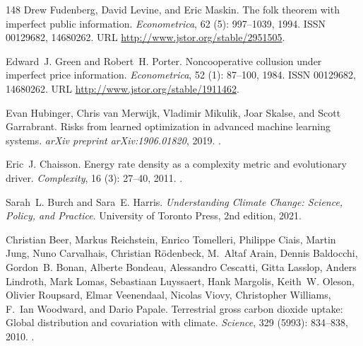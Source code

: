 \documentclass[11pt]{article}
\theoremstyle{plain}
\theoremstyle{definition}
\theoremstyle{remark}
\begin{document}
\begin{thebibliography}{148}
Drew Fudenberg, David Levine, and Eric Maskin.
\newblock The folk theorem with imperfect public information.
\newblock \emph{Econometrica}, 62 (5): 997--1039, 1994.
\newblock ISSN 00129682, 14680262.
\newblock URL \url{http://www.jstor.org/stable/2951505}.

Edward~J. Green and Robert~H. Porter.
\newblock Noncooperative collusion under imperfect price information.
\newblock \emph{Econometrica}, 52 (1): 87--100, 1984.
\newblock ISSN 00129682, 14680262.
\newblock URL \url{http://www.jstor.org/stable/1911462}.

Evan Hubinger, Chris van Merwijk, Vladimir Mikulik, Joar Skalse, and Scott
  Garrabrant.
\newblock Risks from learned optimization in advanced machine learning systems.
\newblock \emph{arXiv preprint arXiv:1906.01820}, 2019.
\newblock {}.

Eric~J. Chaisson.
\newblock Energy rate density as a complexity metric and evolutionary driver.
\newblock \emph{Complexity}, 16 (3): 27--40, 2011.
\newblock {}.

Sarah~L. Burch and Sara~E. Harris.
\newblock \emph{Understanding Climate Change: Science, Policy, and Practice}.
\newblock University of Toronto Press, 2nd edition, 2021.

Christian Beer, Markus Reichstein, Enrico Tomelleri, Philippe Ciais, Martin
  Jung, Nuno Carvalhais, Christian R{\"o}denbeck, M.~Altaf Arain, Dennis
  Baldocchi, Gordon~B. Bonan, Alberte Bondeau, Alessandro Cescatti, Gitta
  Lasslop, Anders Lindroth, Mark Lomas, Sebastiaan Luyssaert, Hank Margolis,
  Keith~W. Oleson, Olivier Roupsard, Elmar Veenendaal, Nicolas Viovy,
  Christopher Williams, F.~Ian Woodward, and Dario Papale.
\newblock Terrestrial gross carbon dioxide uptake: Global distribution and
  covariation with climate.
\newblock \emph{Science}, 329 (5993): 834--838, 2010.
\newblock {}.


\end{thebibliography}
\end{document}
